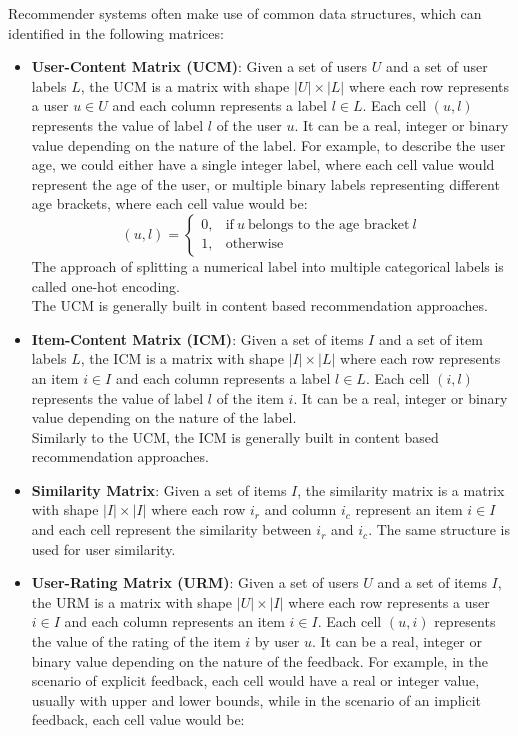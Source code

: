 Recommender systems often make use of common data structures, which can identified in the following matrices:
\begin{itemize}
\item \textbf{User-Content Matrix (UCM)}: Given a set of users $U$ and a set of user labels $L$, the UCM is a matrix with shape $|U| \times |L|$ where each row represents a user $u \in U$ and each column represents a label $l \in L$. Each cell $(u,l)$ represents the value of label $l$ of the user $u$. It can be a real, integer or binary value depending on the nature of the label. For example, to describe the user age, we could either have a single integer label, where each cell value would represent the age of the user, or multiple binary labels representing different age brackets, where each cell value would be:
\begin{equation*}
(u,l)=
\begin{cases}
0, & \text{if}\ u\ \text{belongs to the age bracket}\ l\\
1, & \text{otherwise}
\end{cases}
\end{equation*}
The approach of splitting a numerical label into multiple categorical labels is called one-hot encoding.\\
The UCM is generally built in content based recommendation approaches.
\item \textbf{Item-Content Matrix (ICM)}: Given a set of items $I$ and a set of item labels $L$, the ICM is a matrix with shape $|I| \times |L|$ where each row represents an item $i \in I$ and each column represents a label $l \in L$. Each cell $(i,l)$ represents the value of label $l$ of the item $i$. It can be a real, integer or binary value depending on the nature of the label.\\
Similarly to the UCM, the ICM is generally built in content based recommendation approaches.
\item \textbf{Similarity Matrix}: Given a set of items $I$, the similarity matrix is a matrix with shape $|I| \times |I|$ where each row $i_r$ and column $i_c$ represent an item $i \in I$ and each cell represent the similarity between $i_r$ and $i_c$. The same structure is used for user similarity.
\item \textbf{User-Rating Matrix (URM)}: Given a set of users $U$ and a set of items $I$, the URM is a matrix with shape $|U| \times |I|$ where each row represents a user $i \in I$ and each column represents an item $i \in I$. Each cell $(u,i)$ represents the value of the rating of the item $i$ by user $u$. It can be a real, integer or binary value depending on the nature of the feedback. For example, in the scenario of explicit feedback, each cell would have a real or integer value, usually with upper and lower bounds, while in the scenario of an implicit feedback, each cell value would be:\\

\end{itemize}
